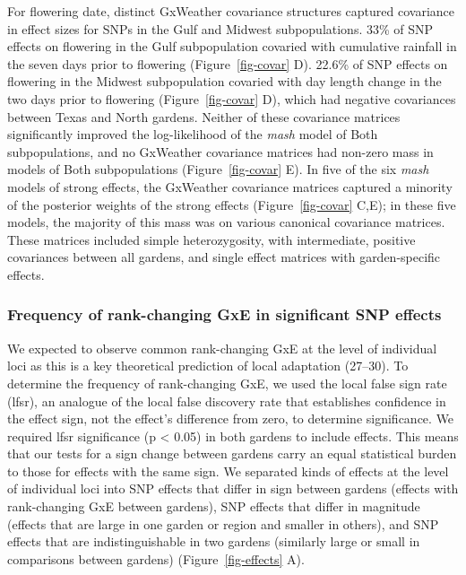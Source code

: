 \documentclass[
  9pt,
  twocolumn,
  twoside]{pnas-new}
\begin{document}
For flowering date, distinct GxWeather covariance structures captured
covariance in effect sizes for SNPs in the Gulf and Midwest
subpopulations. 33\% of SNP effects on flowering in the Gulf
subpopulation covaried with cumulative rainfall in the seven days prior
to flowering (Figure~\ref{fig-covar} D). 22.6\% of SNP effects on
flowering in the Midwest subpopulation covaried with day length change
in the two days prior to flowering (Figure~\ref{fig-covar} D), which had
negative covariances between Texas and North gardens. Neither of these
covariance matrices significantly improved the log-likelihood of the
\emph{mash} model of Both subpopulations, and no GxWeather covariance
matrices had non-zero mass in models of Both subpopulations
(Figure~\ref{fig-covar} E). In five of the six \emph{mash} models of
strong effects, the GxWeather covariance matrices captured a minority of
the posterior weights of the strong effects (Figure~\ref{fig-covar}
C,E); in these five models, the majority of this mass was on various
canonical covariance matrices. These matrices included simple
heterozygosity, with intermediate, positive covariances between all
gardens, and single effect matrices with garden-specific effects.

\subsubsection{Frequency of rank-changing GxE in significant SNP
effects}\label{frequency-of-rank-changing-gxe-in-significant-snp-effects}

We expected to observe common rank-changing GxE at the level of
individual loci as this is a key theoretical prediction of local
adaptation (27--30). To determine the frequency of rank-changing GxE, we
used the local false sign rate (lfsr), an analogue of the local false
discovery rate that establishes confidence in the effect sign, not the
effect's difference from zero, to determine significance. We required
lfsr significance (p \textless{} 0.05) in both gardens to include
effects. This means that our tests for a sign change between gardens
carry an equal statistical burden to those for effects with the same
sign. We separated kinds of effects at the level of individual loci into
SNP effects that differ in sign between gardens (effects with
rank-changing GxE between gardens), SNP effects that differ in magnitude
(effects that are large in one garden or region and smaller in others),
and SNP effects that are indistinguishable in two gardens (similarly
large or small in comparisons between gardens) (Figure~\ref{fig-effects}
A).
\end{document}
